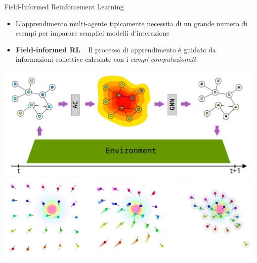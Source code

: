 \documentclass[presentation, 10pt,aspectratio=169]{beamer}\mode<presentation>{\usetheme{AMSBolognaFC}}
\begin{document}
\begin{frame}{Field-Informed Reinforcement Learning}

\begin{minipage}{0.35\textwidth}
	\begin{itemize}
		\item L'apprendimento multi-agente tipicamente necessita di un grande numero di esempi per imparare semplici modelli d'interazione
		\item \textbf{Field-informed RL} \faArrowRight ~ Il processo di apprendimento è guidato da informazioni collettive calcolate con i \emph{campi computazionali}
	\end{itemize}
\end{minipage}
\hfill
\begin{minipage}{0.6\textwidth}
	\centering
	\includegraphics[width=\textwidth]{img/gnn.png}
	\includegraphics[width=\textwidth]{img/gnn-example.png}
\end{minipage}
\end{frame}
\end{document}

